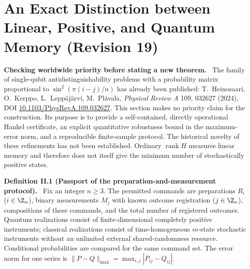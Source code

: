 \documentclass[11pt,a4paper,oneside]{book}
\DeclareMathOperator{\rank}{rank}\DeclareMathOperator{\Tr}{Tr}
\newcommand{\statement}[3]{\par\medskip\noindent\textbf{#1 #2 (#3).}\ }
\newcommand{\note}[1]{\par\medskip\noindent\textbf{#1}\ }
\begin{document}
\chapter{An Exact Distinction between Linear, Positive, and Quantum Memory (Revision 19)}
\note{Checking worldwide priority before stating a new theorem.} The family of single-qubit antidistinguishability problems with a probability matrix proportional to $\sin^2(\pi(i-j)/n)$ has already been published: T.~Heinosaari, O.~Kerppo, L.~Lepp\"aj\"arvi, M.~Pl\'avala, \textit{Physical Review A} 109, 032627 (2024), DOI \href{https://doi.org/10.1103/PhysRevA.109.032627}{10.1103/PhysRevA.109.032627}. This section makes no priority claim for the construction. Its purpose is to provide a self-contained, directly operational Hankel certificate, an explicit quantitative robustness bound in the maximum-error norm, and a reproducible finite-sample protocol. The historical novelty of these refinements has not been established. Ordinary $\rank H$ measures linear memory and therefore does not itself give the minimum number of stochastically positive states.
\statement{Definition}{II.1}{Passport of the preparation-and-measurement protocol} Fix an integer $n\ge3$. The permitted commands are preparations $R_i$ ($i\in\Z_n$), binary measurements $M_j$ with known outcome registration ($j\in\Z_n$), compositions of these commands, and the total number of registered outcomes. Quantum realizations consist of finite-dimensional completely positive instruments; classical realizations consist of time-homogeneous $m$-state stochastic instruments without an unlimited external shared-randomness resource. Conditional probabilities are compared for the same command set. The error norm for one series is $\|P-Q\|_{\max}=\max_{i,j}|P_{ij}-Q_{ij}|$.
\end{document}
